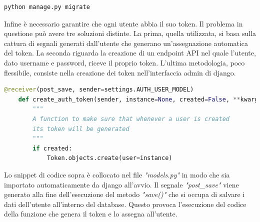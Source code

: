 \documentclass[./main.tex]{subfiles}
\begin{document}
\begin{lstlisting}[language=bash]
    python manage.py migrate
\end{lstlisting}

Infine è necessario garantire che ogni utente abbia il suo token. Il problema in questione può avere tre soluzioni distinte. La prima, quella utilizzata, si basa sulla cattura di segnali generati dall'utente che generano un'assegnazione automatica del token. La seconda riguarda la creazione di un endpoint API nel quale l'utente, dato username e password, riceve il proprio token. L'ultima metodologia, poco flessibile, consiste nella creazione dei token nell'interfaccia admin di django.\par

\begin{lstlisting}[language=Python, caption=models.py]
    @receiver(post_save, sender=settings.AUTH_USER_MODEL)
    def create_auth_token(sender, instance=None, created=False, **kwargs):
        """
        A function to make sure that whenever a user is created 
        its token will be generated
        """
        if created:
            Token.objects.create(user=instance)
\end{lstlisting}

Lo snippet di codice sopra è collocato nel file \textit{"models.py"} in modo che sia importato automaticamente da django all'avvio. Il segnale \textit{"post\_save"} viene generato alla fine dell'esecuzione del metodo \textit{"save()" } che si occupa di salvare i dati dell'utente all'interno del database. Questo provoca l'esecuzione del codice della funzione che genera il token e lo assegna all'utente.\par
\end{document}
